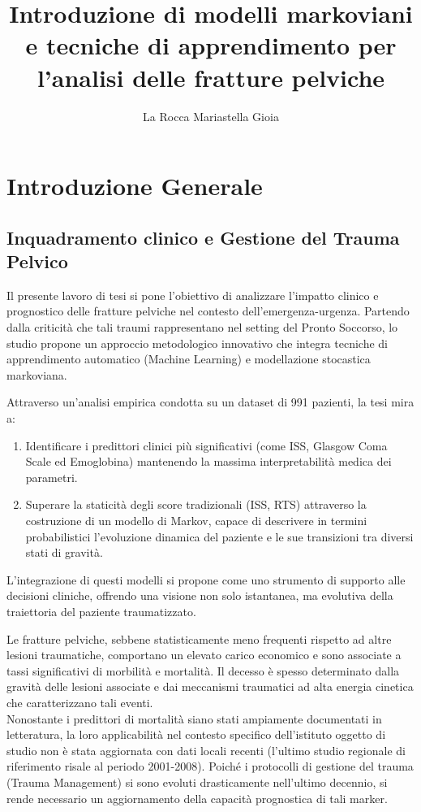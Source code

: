 \documentclass[11pt, oneside, noexaminfo]{sapthesis}   	%
\title{Introduzione di modelli markoviani e tecniche di apprendimento per l'analisi delle fratture pelviche}
\author{La Rocca Mariastella Gioia}
\begin{document}
\frontmatter
\maketitle
\tableofcontents
\mainmatter
\chapter{Introduzione Generale}
\section{Inquadramento clinico e Gestione del Trauma Pelvico}
Il presente lavoro di tesi si pone l'obiettivo di analizzare l'impatto clinico e prognostico delle fratture pelviche nel contesto dell'emergenza-urgenza. Partendo dalla criticità che tali traumi rappresentano nel setting del Pronto Soccorso, lo studio propone un approccio metodologico innovativo che integra tecniche di apprendimento automatico (Machine Learning) e modellazione stocastica markoviana.

Attraverso un'analisi empirica condotta su un dataset di 991 pazienti, la tesi mira a:
\begin{enumerate}
	\item Identificare i predittori clinici più significativi (come ISS, Glasgow Coma Scale ed Emoglobina) mantenendo la massima interpretabilità medica dei parametri.

	\item Superare la staticità degli score tradizionali (ISS, RTS) attraverso la costruzione di un modello di Markov, capace di descrivere in termini probabilistici l’evoluzione dinamica del paziente e le sue transizioni tra diversi stati di gravità.
\end{enumerate}
L'integrazione di questi modelli si propone come uno strumento di supporto alle decisioni cliniche, offrendo una visione non solo istantanea, ma evolutiva della traiettoria del paziente traumatizzato.

Le fratture pelviche, sebbene statisticamente meno frequenti rispetto ad altre lesioni traumatiche, comportano un elevato carico economico \cite{demetriades2002pelvic} e sono associate a tassi significativi di morbilità e mortalità. Il decesso è spesso determinato dalla gravità delle lesioni associate e dai meccanismi traumatici ad alta energia cinetica che caratterizzano tali eventi.\\

Nonostante i predittori di mortalità siano stati ampiamente documentati in letteratura, la loro applicabilità nel contesto specifico dell'istituto oggetto di studio non è stata aggiornata con dati locali recenti (l’ultimo studio regionale di riferimento risale al periodo 2001-2008). Poiché i protocolli di gestione del trauma (Trauma Management) si sono evoluti drasticamente nell'ultimo decennio, si rende necessario un aggiornamento della capacità prognostica di tali marker.\\
\end{document}

